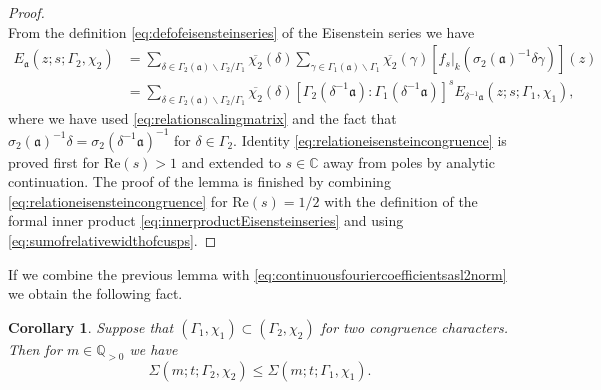\documentclass{article}
\newtheorem{cor}[thm]{Corollary}
\theoremstyle{named}
\newcommand{\Q}{\mathbb{Q}}
\newcommand{\CC}{\mathbb{C}}
\renewcommand{\a}{\mathfrak{a}}
\begin{document}
\begin{proof}
\begin{equation}
\end{equation}
From the definition \eqref{eq:defofeisensteinseries} of the Eisenstein series we have  
\begin{equation}\label{eq:relationeisensteincongruence}
\begin{aligned}
    E_\a(z; s; \Gamma_2, \chi_2) & = \sum_{\delta \in \Gamma_2(\a) \backslash \Gamma_2/\Gamma_1} \overline{\chi_2}(\delta)\sum_{\gamma \in \Gamma_1(\a)\backslash \Gamma_1} \overline{\chi_2}(\gamma) [f_s |_k (\sigma_2(\a)^{-1}\delta \gamma)](z)\\
    & = \sum_{\delta \in \Gamma_2(\a) \backslash \Gamma_2/\Gamma_1} \overline{\chi_2}(\delta)[\Gamma_2(\delta^{-1}\a): \Gamma_1(\delta^{-1}\a)]^s E_{\delta^{-1}\a}(z; s; \Gamma_1, \chi_1),
\end{aligned}
\end{equation}
where we have used \eqref{eq:relationscalingmatrix} and the fact that $\sigma_2(\a)^{-1}\delta = \sigma_2(\delta^{-1}\a)^{-1}$ for $\delta \in \Gamma_2$. Identity \eqref{eq:relationeisensteincongruence} is proved first for $\text{Re}(s) > 1$ and extended to $s \in \CC$ away from poles by analytic continuation. The proof of the lemma is finished by combining \eqref{eq:relationeisensteincongruence} for $\text{Re}(s) = 1/2$ with the definition of the formal inner product \eqref{eq:innerproductEisensteinseries} and using \eqref{eq:sumofrelativewidthofcusps}.
\end{proof}
If we combine the previous lemma with \eqref{eq:continuousfouriercoefficientsasl2norm} we obtain the following fact.
\begin{cor}\label{cor:monotonicityoffouriercoefficients}
Suppose that $(\Gamma_1, \chi_1)\subset (\Gamma_2, \chi_2)$ for two congruence characters. Then for $m \in \Q_{> 0}$ we have 
\begin{equation*}
\Sigma(m; t; \Gamma_2, \chi_2) \leq \Sigma(m; t; \Gamma_1, \chi_1).
\end{equation*}
\end{cor}
\end{document}
